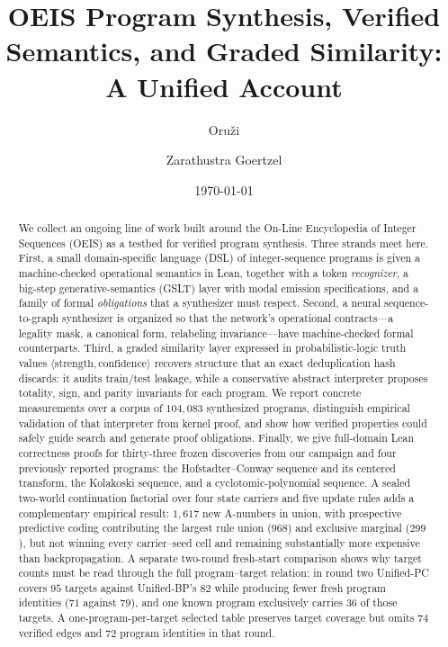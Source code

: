 \documentclass[11pt]{article}
\title{OEIS Program Synthesis, Verified Semantics, and Graded Similarity:\\
       A Unified Account}
\author{Oru\v{z}i \and Zarathustra Goertzel}
\date{\today}
\newif\ifoeisterminalfacts
\newif\ifoeisadversarialfacts
\begin{document}
\maketitle

\begin{abstract}
We collect an ongoing line of work built around the On-Line Encyclopedia of Integer
Sequences (OEIS) as a testbed for verified program synthesis. Three strands meet here.
First, a small domain-specific language (DSL) of integer-sequence programs is given a
machine-checked operational semantics in Lean, together with a token \emph{recognizer},
a big-step generative-semantics (GSLT) layer with modal emission specifications, and a
family of formal \emph{obligations} that a synthesizer must respect. Second, a neural
sequence-to-graph synthesizer is organized so that the network's operational
contracts---a legality mask, a canonical form, relabeling invariance---have
machine-checked formal counterparts. Third, a graded similarity layer expressed in
probabilistic-logic truth values $\langle\text{strength},\text{confidence}\rangle$
recovers structure that an exact deduplication hash discards: it audits train/test
leakage, while a conservative abstract interpreter proposes totality, sign, and parity
invariants for each program. We report concrete measurements over a corpus of
$104{,}083$ synthesized programs, distinguish empirical validation of that interpreter
from kernel proof, and show how verified properties could safely guide search and
generate proof obligations. Finally, we give full-domain Lean correctness proofs for
thirty-three frozen discoveries from our campaign and four previously reported programs:
the Hofstadter--Conway sequence and its centered transform, the Kolakoski sequence, and a
cyclotomic-polynomial sequence. A sealed two-world continuation factorial over four
state carriers and five update rules adds a complementary empirical result: $1{,}617$
new A-numbers in union, with prospective predictive coding contributing the largest
rule union ($968$) and exclusive marginal ($299$), but not winning every carrier--seed
cell and remaining substantially more expensive than backpropagation.
A separate two-round fresh-start comparison shows why target counts must be read through
the full program--target relation: in round two Unified-PC covers $95$ targets against
Unified-BP's $82$ while producing fewer fresh program identities ($71$ against $79$),
and one known program exclusively carries $36$ of those targets. A one-program-per-target
selected table preserves target coverage but omits $74$ verified edges and $72$ program
identities in that round.
\ifoeisterminalfacts
A subsequent mis-specified branch (footnoted in Section~\ref{sec:roadmap}) added
\oeisTerminalCumulativeUnion{} further verified A-numbers to the pool; its
update-rule comparisons are recorded but carry no evidential weight on the
from-scratch question.
\fi
\ifoeisadversarialfacts
A post-seal candidate-blind adjudication refuted
\oeisAdversarialRefutedEdges{} of \oeisAdversarialCandidateEdges{} frozen candidate
edges by independent executable replay; every refutation is an unbounded continuation
of a finite entry, none a value disagreement inside the published range.
\fi
\end{abstract}
\end{document}
